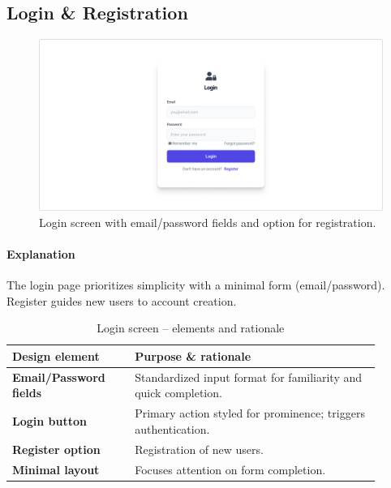\documentclass[12pt]{article}
\begin{document}

	\subsection{Login \& Registration}\label{subsec:login-register}

	\begin{figure}[H]
		\centering
		\includegraphics[width=1.0\linewidth]{pictures/main/LoginPage_Figma}%
		\caption{Login screen with email/password fields and option for registration.}
		\label{fig:ui-login}
	\end{figure}

	\paragraph{Explanation}%
	The login page prioritizes simplicity with a minimal form (email/password).
	Register guides new users to account creation. 
	\begin{table}[H]
		\centering
		\caption{Login screen – elements and rationale}
		\label{tab:login-elements}
		\begin{tabular}{p{0.30\linewidth} p{0.60\linewidth}}
			\toprule
			\textbf{Design element} & \textbf{Purpose \& rationale} \\ \midrule
			\textbf{Email/Password fields}  & Standardized input format for familiarity and quick completion. \\
			\textbf{Login button}       	& Primary action styled for prominence; triggers authentication. \\
			\textbf{Register option}        & Registration of new users. \\
			\textbf{Minimal layout}         & Focuses attention on form completion. \\
			\bottomrule
		\end{tabular}
	\end{table}
\end{document}
